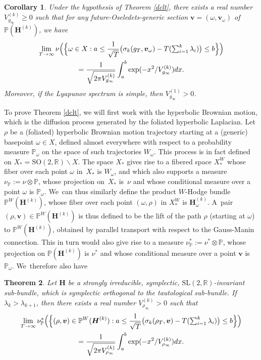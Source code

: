 \documentclass[10pt]{amsart}
\theoremstyle{plain}
\newtheorem{thm}{Theorem}[section]
\newtheorem{cor}[thm]{Corollary}
\theoremstyle{definition}
\numberwithin{equation}{subsection}
\newcommand\bP{\mathbb{P}}
\newcommand\bR{\mathbb{R}}\let\R\bR
\newcommand{\SL}{\mathrm{SL}}
\newcommand{\SO}{\mathrm{SO}}
\newcommand{\bfH}{\boldsymbol{H}}
\newcommand{\bfv}{\boldsymbol{v}}
\newcommand{\defeq}{:=}
\begin{document}
\begin{cor}
Under the hypothesis of Theorem \ref{dclt}, there exists a real number $V^{(k)}_{g_\infty} \geq 0$ such that for any future-Oseledets-generic section $\bfv=(\omega,\bfv_{\omega})$ of $\bP(\bfH^{(k)})$, we have
\begin{multline*}
\lim_{T\to\infty} \nu\Bigl(\Bigl\{\omega\in X :a \leq \frac{1}{\sqrt{T}} \bigl(\sigma_k(g_{T}, \bfv_\omega)- T(\textstyle\sum_{i=1}^k \lambda_i) \bigr) \leq b \Bigr\} \Bigr)
\\= \frac{1}{\sqrt{2\pi V^{(k)}_{g_\infty}}}\int_a^b\exp(-x^2/ V^{(k)}_{g_\infty})dx.
\end{multline*}
Moreover, if the Lyapunov spectrum is simple, then $V^{(1)}_{g_\infty} > 0$.
\end{cor}

To prove Theorem \ref{dclt}, we will first work with the hyperbolic Brownian motion, which is the diffusion process generated by the foliated hyperbolic Laplacian. Let $\rho$ be a (foliated) hyperbolic Brownian motion trajectory starting at a (generic) basepoint $\omega \in X$, defined almost everywhere with respect to a probability measure $\bP_\omega$ on the space of such trajectories $W_\omega$. This process is in fact defined on $X_* = \SO(2,\bR)\backslash X$. The space $X_*$ gives rise to a fibered space $X^{W}_*$ whose fiber over each point $\omega$ in~$X_*$ is $W_\omega$, and which also supports a measure $\nu_{\bP} \defeq \nu \otimes \bP$, whose projection on~$X_*$ is~$\nu$ and whose conditional measure over a point $\omega$ is $\bP_\omega$. We~can thus similarly define the product $W$-Hodge bundle $\bP^W(\bfH^{(k)})$, whose fiber over each point $(\omega,\rho)$ in $X^{W}_*$ is $\bfH^{(k)}_\omega$. A~pair $(\rho,\bfv) \in \bP^W(\bfH^{(k)})$ is thus defined to be the lift of the path $\rho$ (starting at $\omega$) to $\bP^W(\bfH^{(k)})$, obtained by parallel transport with respect to the Gauss-Manin connection. This in turn would also give rise to a measure $\nu^*_{\bP}\defeq \nu^* \otimes \bP$, whose projection on $\bP(\bfH^{(k)})$ is $\nu^*$ and whose conditional measure over a point $\bfv$ is $\bP_\omega$. We~therefore also have

\begin{thm}\label{rclt}
Let $\bfH$ be a strongly irreducible, symplectic, $\SL(2,\R)$-invariant sub-bundle, which is symplectic orthogonal to the tautological sub-bundle. If $\lambda_k > \lambda_{k+1}$, then there exists a real number $V^{(k)}_{\rho_\infty} > 0$ such that
\begin{multline*}
\lim_{T\to\infty}\nu^*_{\bP} \Bigl(\Bigl\{(\rho,\bfv) \in \bP^W(\bfH^{(k)}) : a \leq \frac{1}{\sqrt{T}} \bigl(\sigma_k(\rho_{T}, \bfv)- T(\textstyle\sum_{i=1}^k\lambda_{i}) \bigr) \leq b \Bigr\} \Bigr)
\\ = \frac{1}{\sqrt{2\pi V^{(k)}_{\rho_\infty}}}\int_a^b\exp(-x^2/V^{(k)}_{\rho_\infty})dx.
\end{multline*}
\end{thm}
\end{document}
